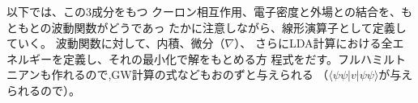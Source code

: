 \documentclass[a4paper,10pt,aip,onecolumn,amsmath,amssymb,floatfix,rmp]{revtex4-1}
\begin{document}
以下では、この3成分をもつ
クーロン相互作用、電子密度と外場との結合を、もともとの波動関数がどうであっ
たかに注意しながら、線形演算子として定義していく。
波動関数に対して、内積、微分（$\nabla$）、
さらにLDA計算における全エネルギーを定義し、それの最小化で解をもとめる方
程式をだす。フルハミルトニアンも作れるので,GW計算の式などもおのずと与えられる
（$\langle \psi \psi |v| \psi \psi \rangle$が与えられるので）。












\end{document}
